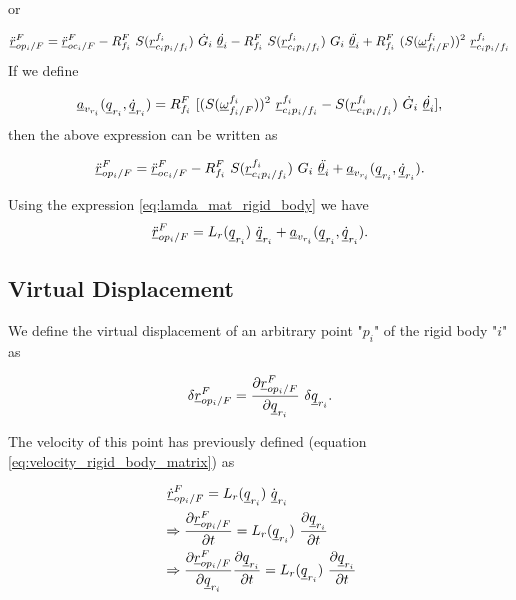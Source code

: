 or 

\[
    \pvec{\ddot{r}}{op_{i}}{F}{F} = \pvec{\ddot{r}}{oc_{i}}{F}{F} - 
    \rot{R}{f_{i}}{F} \ S(\pvec{r}{c_{i}p_{i}}{f_i}{f_i}) \ \dot{G}_{i} \ \dot{\vecd{\theta}_{i}}
    -     \rot{R}{f_{i}}{F} \ S(\pvec{r}{c_{i}p_{i}}{f_i}{f_i}) \ {G}_{i} \ \ddot{\vecd{\theta}_{i}}
    + \rot{R}{f_{i}}{F} \ (S(\pvec{\omega}{f_{i}}{F}{f_i}))^{2} \ \pvec{r}{c_{i}p_{i}}{f_i}{f_i}  
    \]
If we define 

\begin{equation}    
\vecd{a}_{v_{r_i}}(\vecd{q}_{r_{i}}, \vecd{\dot{q}}_{r_{i}}) = 
    \rot{R}{f_{i}}{F}\ [ (S(\pvec{\omega}{f_{i}}{F}{f_i}))^{2} \ \pvec{r}{c_{i}p_{i}}{f_i}{f_i}  
    - S(\pvec{r}{c_{i}p_{i}}{f_i}{f_i}) \ \dot{G}_{i} \ \dot{\vecd{\theta}_{i}}],
    \label{coriolis_acceleration_rigid_body}
\end{equation}
then the above expression can be written as 

\[    
    \pvec{\ddot{r}}{op_{i}}{F}{F} = \pvec{\ddot{r}}{oc_{i}}{F}{F} 
    - \rot{R}{f_{i}}{F} \ S(\pvec{r}{c_{i}p_{i}}{f_i}{f_i}) \ {G}_{i} \ 
    \ddot{\vecd{\theta}_{i}} + \vecd{a}_{v_{r_i}}(\vecd{q}_{r_{i}}, 
    \vecd{\dot{q}}_{r_{i}}). 
\] 

Using the expression \eqref{eq:lamda_mat_rigid_body} we have 
\begin{equation} 
    \pvec{\ddot{r}}{op_{i}}{F}{F} = L_{r}(\vecd{q}_{r_{i}}) \ 
    \vecd{\ddot{q}}_{r_{i}} + \vecd{a}_{v_{r_i}}(\vecd{q}_{r_{i}}, 
    \vecd{\dot{q}}_{r_{i}}).
    \label{acceleration_rigid_body_matrix}
\end{equation}

\subsection{Virtual Displacement}

We define the virtual displacement of an arbitrary point "$p_{i}$" of the 
rigid body "$i$" as 

\begin{equation}
    \delta \pvec{r}{op_{i}}{F}{F} = \frac{\partial \pvec{r}{op_{i}}{F}{F}}{\partial\vecd{q}_{r_{i}}}
    \ \delta \vecd{q}_{r_{i}}.
    \label{eq:virtual_displacement_in}
\end{equation}

The velocity of this point has previously defined 
(equation \eqref{eq:velocity_rigid_body_matrix}) as 

\begin{align*}
    & \ \pvec{\dot{r}}{op_{i}}{F}{F}  = L_{r}(\vecd{q}_{r_{i}}) \ \dot{\vecd{q}}_{r_{i}} \\ 
    & \Rightarrow  \frac{\partial \pvec{r}{op_{i}}{F}{F}}{\partial t} = 
    L_{r}(\vecd{q}_{r_{i}}) \ \frac{\partial \vecd{q}_{r_{i}}}{\partial t} \\ 
    & \Rightarrow  \frac{\partial \pvec{r}{op_{i}}{F}{F}}{\partial \vecd{q}_{r_{i}}} 
    \frac{\partial \vecd{q}_{r_{i}}}{\partial t} = 
    L_{r}(\vecd{q}_{r_{i}}) \ \frac{\partial \vecd{q}_{r_{i}}}{\partial t}
\end{align*}

